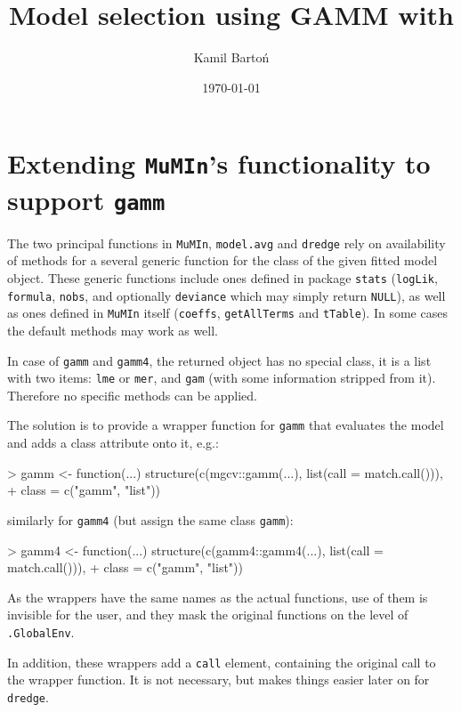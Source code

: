 \documentclass{article}
\title{Model selection using GAMM with \pkg{MuMIn} }
\date{\today}
\author{Kamil Bartoń}
\newcommand{\code}[1]{{\tt #1}}
\newcommand{\pkg}[1]{{\tt #1}}
\begin{document}
\maketitle


\section{Extending \pkg{MuMIn}'s functionality to support \code{gamm} }

The two principal functions in \pkg{MuMIn}, \code{model.avg} and \code{dredge}
rely on availability of methods for a several generic function for the class of
the given fitted model object.
These generic functions include ones defined in package \code{stats}
(\code{logLik}, \code{formula}, \code{nobs},
and optionally \code{deviance} which may simply return \code{NULL}), as well
as ones defined in \pkg{MuMIn} itself (\code{coeffs},
\code{getAllTerms} and \code{tTable}). In some cases the default methods may
work as well.

In case of \code{gamm} and \code{gamm4}, the returned object has no special
class, it is a list with two items: \code{lme} or \code{mer}, and \code{gam}
(with some information stripped from it).
Therefore no specific methods can be applied.

The solution is to provide a wrapper function for \code{gamm} that evaluates
the model and adds a class attribute onto it, e.g.:
\begin{Schunk}
\begin{Sinput}
> gamm <- function(...) structure(c(mgcv::gamm(...), list(call = match.call())), 
+     class = c("gamm", "list"))
\end{Sinput}
\end{Schunk}
similarly for \code{gamm4} (but assign the same class \code{gamm}):
\begin{Schunk}
\begin{Sinput}
> gamm4 <- function(...) structure(c(gamm4::gamm4(...), list(call = match.call())), 
+     class = c("gamm", "list"))
\end{Sinput}
\end{Schunk}

As the wrappers have the same names as the actual functions, use of them is
invisible for the user, and they mask the original functions on the level of
\code{.GlobalEnv}.

In addition, these wrappers add a \code{call} element, containing the original
call to the wrapper function. It is not necessary, but makes things easier later
on for \code{dredge}.
\end{document}
